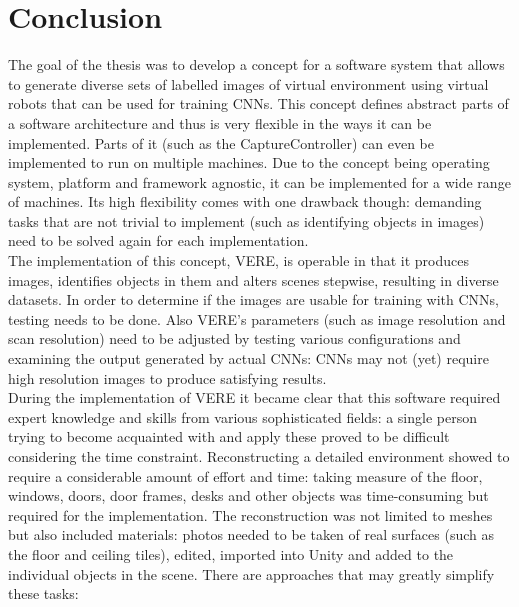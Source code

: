 \chapter{Conclusion}
\label{chap:conclusion}
The goal of the thesis was to develop a concept for a software system that allows to generate diverse sets of labelled images of virtual environment using virtual robots that can be used for training \acp{CNN}. This concept defines abstract parts of a software architecture and thus is very flexible in the ways it can be implemented. Parts of it (such as the CaptureController) can even be implemented to run on multiple machines. Due to the concept being operating system, platform and framework agnostic, it can be implemented for a wide range of machines. Its high flexibility comes with one drawback though: demanding tasks that are not trivial to implement (such as identifying objects in images) need to be solved again for each implementation.\\
The implementation of this concept, \ac{VERE}, is operable in that it produces images, identifies objects in them and alters scenes stepwise, resulting in diverse datasets. In order to determine if the images are usable for training with \acp{CNN}, testing needs to be done. Also \ac{VERE}'s parameters (such as image resolution and scan resolution) need to be adjusted by testing various configurations and examining the output generated by actual \acp{CNN}: \acp{CNN} may not (yet) require high resolution images to produce satisfying results.\\
During the implementation of \ac{VERE} it became clear that this software required expert knowledge and skills from various sophisticated fields: a single person trying to become acquainted with and apply these proved to be difficult considering the time constraint. Reconstructing a detailed environment showed to require a considerable amount of effort and time: taking measure of the floor, windows, doors, door frames, desks and other objects was time-consuming but required for the implementation. The reconstruction was not limited to meshes but also included materials: photos needed to be taken of real surfaces (such as the floor and ceiling tiles), edited, imported into Unity and added to the individual objects in the scene. There are approaches that may greatly simplify these tasks:
